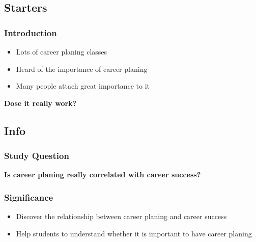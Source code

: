 \subsection{Starters}
\begin{frame}
    \frametitle{Introduction}
    \Large
    \begin{itemize}[<+->]
        \item Lots of career planing classes
        \item Heard of the importance of career planing
        \item Many people attach great importance to it
    \end{itemize}
    \begin{center}
        \LARGE
        \textbf{Dose it really work?} 
    \end{center}
\end{frame}

\subsection{Info}
\begin{frame}
    \frametitle{Study Question}
    \Huge
    \begin{center}
        \textbf{Is career planing really correlated with career success?}        
    \end{center}
\end{frame}

\begin{frame}
    \frametitle{Significance}  
    \Large
    \begin{itemize}
        \item Discover the relationship between career planing and career success
        \item Help students to understand whether it is important to have career planing
    \end{itemize}
\end{frame}